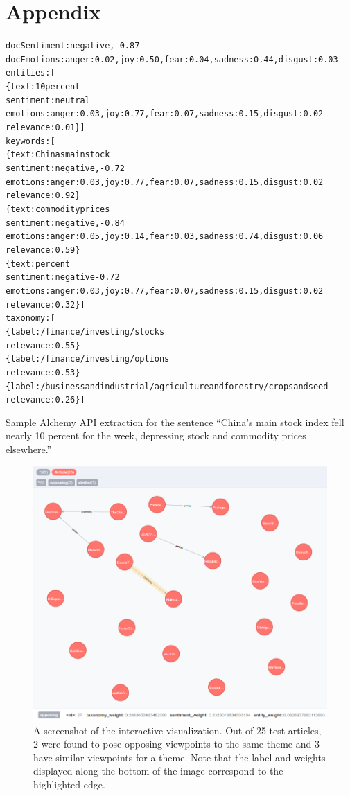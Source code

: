 \documentclass[12pt]{article}
\begin{document}
\section{Appendix}
\begin{alltt}
docSentiment: negative, -0.87
docEmotions: anger: 0.02, joy: 0.50, fear: 0.04, sadness: 0.44, disgust: 0.03
entities: [
  \{ text: 10 percent
    sentiment: neutral
    emotions: anger: 0.03, joy: 0.77, fear: 0.07, sadness: 0.15, disgust: 0.02
    relevance: 0.01 \} ]
keywords: [
  \{ text: Chinas main stock
    sentiment: negative, -0.72
    emotions: anger: 0.03, joy: 0.77, fear: 0.07, sadness: 0.15, disgust: 0.02
    relevance: 0.92 \}
  \{ text: commodity prices
    sentiment: negative, -0.84
    emotions: anger: 0.05, joy: 0.14, fear: 0.03, sadness: 0.74, disgust: 0.06
    relevance: 0.59 \}
  \{ text: percent
    sentiment: negative -0.72
    emotions: anger: 0.03, joy: 0.77, fear: 0.07, sadness: 0.15, disgust: 0.02
    relevance: 0.32 \} ]
taxonomy: [
  \{ label: /finance/investing/stocks
    relevance: 0.55 \}
  \{ label: /finance/investing/options
    relevance: 0.53 \}
  \{ label: /business and industrial/agriculture and forestry/crops and seed
    relevance: 0.26 \} ]
\end{alltt}
Sample Alchemy API extraction for the sentence ``China's main stock index fell nearly 10 percent for the week, depressing stock and commodity prices elsewhere.''

\begin{figure}[here]
\includegraphics[width=6.5in]{graph_screenshot}
\caption{A screenshot of the interactive visualization. Out of 25 test articles, 2 were found to pose opposing viewpoints to the same theme and 3 have similar viewpoints for a theme. Note that the label and weights displayed along the bottom of the image correspond to the highlighted edge.}
\label{fig:graph}
\end{figure}
\end{document}
